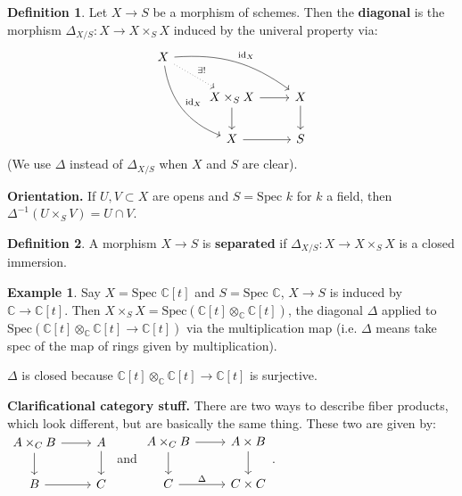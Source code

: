 \documentclass{article}
\theoremstyle{definition}
\newtheorem{example}{Example}[section]
\newtheorem{defn}{Definition}[section]
\begin{document}
\begin{defn}
    Let $X \to S$ be a morphism of schemes. Then the \textbf{diagonal} is the morphism $\Delta_{X/S} : X \to X \times_S X$ induced by the univeral property via:
    \[
        \begin{tikzcd}[]
            X & &\\
            &X \times_S X & X\\
            & X & S
            \arrow["", from=2-3, to=3-3]
            \arrow["",from=2-2, to=3-2]
            \arrow["", from=3-2, to=3-3]
            \arrow["", from=2-2, to=2-3]
            \arrow["\exists !", from=1-1, to=2-2, dotted]
            \arrow["\text{id}_X",from=1-1, to=2-3, bend left=20]
            \arrow["\text{id}_X",from=1-1, to=3-2, bend right=30]
        \end{tikzcd}
    \]
    (We use $\Delta$ instead of $\Delta_{X/S}$ when $X$ and $S$ are clear).
\end{defn}
\textbf{Orientation.} If $U, V \subset X$ are opens and $S =\text{Spec }k$ for $k$ a field, then $\Delta^{-1}(U \times_S V) = U \cap V$.
\begin{defn}
    A morphism $X \to S$ is \textbf{separated} if $\Delta_{X/S} : X \to X \times_S X$ is a closed immersion.
\end{defn}
\begin{example}\label{example4.3}
    Say $X = \text{Spec }\mathbb{C}[t]$ and $S = \text{Spec }\mathbb{C}$, $X \to S$ is induced by $\mathbb{C} \to \mathbb{C}[t]$. Then $X \times_S X = \text{Spec}(\mathbb{C}[t] \otimes_\mathbb{C} \mathbb{C}[t])$, the diagonal $\Delta$ applied to $\text{Spec}(\mathbb{C}[t]\otimes_{\mathbb{C}} \mathbb{C}[t] \to \mathbb{C}[t])$ via the multiplication map (i.e. $\Delta$ means take spec of the map of rings given by multiplication).
    \vspace{1mm}
     
    $\Delta$ is closed because $\mathbb{C}[t]\otimes_\mathbb{C} \mathbb{C}[t] \to \mathbb{C}[t]$ is surjective.
\end{example}
\textbf{Clarificational category stuff.} There are two ways to describe fiber products, which look different, but are basically the same thing. These two are given by: $\begin{tikzcd}[]
    A \times_C B & A\\
    B & C
    \arrow["", from=1-2, to=2-2]
    \arrow["",from=1-1, to=2-1]
    \arrow["", from=2-1, to=2-2]
    \arrow["", from=1-1, to=1-2]
\end{tikzcd}$ and $\begin{tikzcd}[]
    A \times_C B & A \times B\\
    C & C \times C
    \arrow["", from=1-2, to=2-2]
    \arrow["",from=1-1, to=2-1]
    \arrow["\Delta", from=2-1, to=2-2]
    \arrow["", from=1-1, to=1-2]
\end{tikzcd}$.
\end{document}

